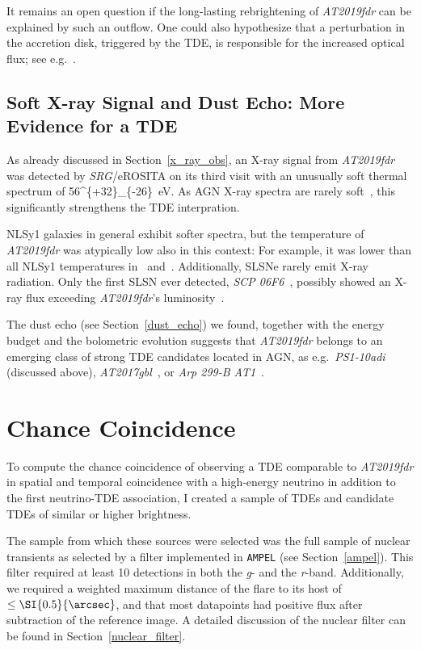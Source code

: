 It remains an open question if the long-lasting rebrightening of \emph{AT2019fdr} can be explained by such an outflow. One could also hypothesize that a perturbation in the accretion disk, triggered by the TDE, is responsible for the increased optical flux; see e.g.~.

\subsection{Soft X-ray Signal and Dust Echo: More Evidence for a TDE}
As already discussed in Section~\ref{x_ray_obs}, an X-ray signal from \textit{AT2019fdr} was detected by \textit{SRG}/eROSITA on its third visit with an unusually soft thermal spectrum of \SI[parse-numbers = false]{56^{+32}_{-26}}{\eV}. As AGN X-ray spectra are rarely soft~, this significantly strengthens the TDE interpration.

NLSy1 galaxies in general exhibit softer spectra, but the temperature of \emph{AT2019fdr} was atypically low also in this context: For example, it was lower than all NLSy1 temperatures in~ and~. Additionally, SLSNe rarely emit X-ray radiation. Only the first SLSN ever detected, \textit{SCP 06F6}~, possibly showed an X-ray flux exceeding \emph{AT2019fdr}'s luminosity~.

The dust echo (see Section~\ref{dust_echo}) we found, together with the energy budget and the bolometric evolution suggests that \emph{AT2019fdr} belongs to an emerging class of strong TDE candidates located in AGN, as e.g.\ \emph{PS1-10adi} (discussed above), \emph{AT2017gbl}~, or \emph{Arp 299-B AT1}~.

\section{Chance Coincidence}
To compute the chance coincidence of observing a TDE comparable to \emph{AT2019fdr} in spatial and temporal coincidence with a high-energy neutrino in addition to the first neutrino-TDE association, I created a sample of TDEs and candidate TDEs of similar or higher brightness.

The sample from which these sources were selected was the full sample of nuclear transients as selected by a filter implemented in \texttt{AMPEL} (see Section~\ref{ampel}). This filter required at least 10 detections in both the \textit{g}- and the \textit{r}-band. Additionally, we required a weighted maximum distance of the flare to its host of $\leq \SI{0.5}{\arcsec}$, and that most datapoints had positive flux after subtraction of the reference image. A detailed discussion of the nuclear filter can be found in Section~\ref{nuclear_filter}.

